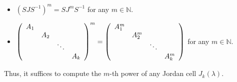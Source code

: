 \documentclass[numbers=enddot,12pt,final,onecolumn,notitlepage]{scrartcl}%
\numberwithin{exer}{subsection}
\theoremstyle{definition}
\begin{document}
\begin{itemize}
\item $\left(  SJS^{-1}\right)  ^{m}=SJ^{m}S^{-1}$ for any $m\in\mathbb{N}$.

\item $\left(
\begin{array}
[c]{cccc}%
A_{1} &  &  & \\
& A_{2} &  & \\
&  & \ddots & \\
&  &  & A_{k}%
\end{array}
\right)  ^{m}=\left(
\begin{array}
[c]{cccc}%
A_{1}^{m} &  &  & \\
& A_{2}^{m} &  & \\
&  & \ddots & \\
&  &  & A_{k}^{m}%
\end{array}
\right)  $ for any $m\in\mathbb{N}$.
\end{itemize}

Thus, it suffices to compute the $m$-th power of any Jordan cell $J_{k}\left(
\lambda\right)  $.
\end{document}
